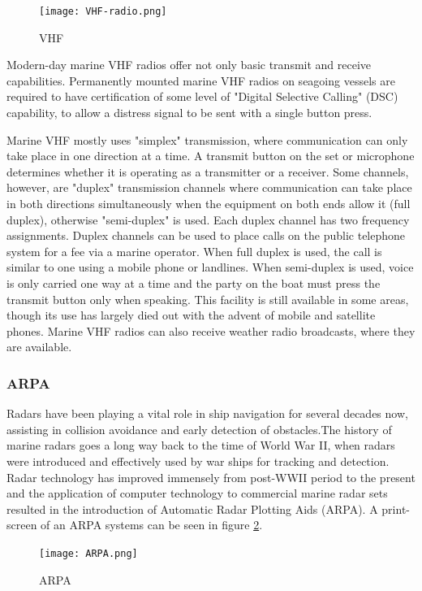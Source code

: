 \begin{figure}[H]
	\centering
	\texttt{[image: VHF-radio.png]}
	\caption{\acf{VHF}}
	\label{fig:vhf-radio}
\end{figure}

Modern-day marine VHF radios offer not only basic transmit and receive capabilities. Permanently mounted marine VHF radios on seagoing vessels are required to have certification of some level of "Digital Selective Calling" (DSC) capability, to allow a distress signal to be sent with a single button press.

Marine VHF mostly uses "simplex" transmission, where communication can only take place in one direction at a time. A transmit button on the set or microphone determines whether it is operating as a transmitter or a receiver. Some channels, however, are "duplex" transmission channels where communication can take place in both directions simultaneously when the equipment on both ends allow it (full duplex), otherwise "semi-duplex" is used. Each duplex channel has two frequency assignments. Duplex channels can be used to place calls on the public telephone system for a fee via a marine operator. When full duplex is used, the call is similar to one using a mobile phone or landlines. When semi-duplex is used, voice is only carried one way at a time and the party on the boat must press the transmit button only when speaking. This facility is still available in some areas, though its use has largely died out with the advent of mobile and satellite phones. Marine VHF radios can also receive weather radio broadcasts, where they are available.

\subsubsection{\acf{ARPA}}
Radars have been playing a vital role in ship navigation for several decades now, assisting in collision avoidance and early detection of obstacles.The history of marine radars goes a long way back to the time of World War II, when radars were introduced and effectively used by war ships for tracking and detection. Radar technology has improved immensely from post-WWII period to the present and the application of computer technology to commercial marine radar sets resulted in the introduction of Automatic Radar Plotting Aids (ARPA). A print-screen of an ARPA systems can be seen in figure \ref{fig:ARPA}.

\begin{figure}[H]
	\centering
	\texttt{[image: ARPA.png]}
	\caption{\acf{ARPA}}
	\label{fig:ARPA}
\end{figure}

